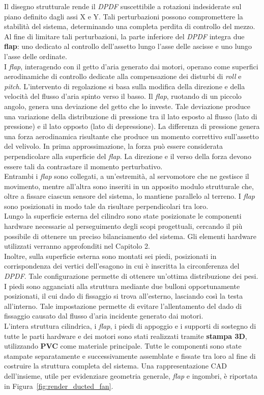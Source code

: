\documentclass[11pt]{report}
\begin{document}
	\newpage
	Il disegno strutturale rende il \textit{DPDF} suscettibile a rotazioni indesiderate sul piano definito dagli assi X e Y. Tali perturbazioni possono compromettere la stabilità del sistema, determinando una completa perdita di controllo del mezzo.\\
	Al fine di limitare tali perturbazioni, la parte inferiore del \textit{DPDF} integra due \textbf{flap}: uno dedicato al controllo dell'assetto lungo l'asse delle ascisse e uno lungo l'asse delle ordinate.\\
	I \textit{flap}, interagendo con il getto d'aria generato dai motori, operano come superfici aerodinamiche di controllo dedicate alla compensazione dei disturbi di \textit{roll} e \textit{pitch}. L'intervento di regolazione si basa sulla modifica della direzione e della velocità del flusso d'aria spinto verso il basso. Il \textit{flap}, ruotando di un piccolo angolo, genera una deviazione del getto che lo investe. Tale deviazione produce una variazione della distribuzione di pressione tra il lato esposto al flusso (lato di pressione) e il lato opposto (lato di depressione). La differenza di pressione genera una forza aerodinamica risultante che produce un momento correttivo sull'assetto del velivolo. In prima approssimazione, la forza può essere considerata perpendicolare alla superficie del \textit{flap}. La direzione e il verso della forza devono essere tali da contrastare il momento perturbativo.\\
	Entrambi i \textit{flap} sono collegati, a un'estremità, al servomotore che ne gestisce il movimento, mentre all'altra sono inseriti in un apposito modulo strutturale che, oltre a fissare ciascun sensore del sistema, lo mantiene parallelo al terreno. I \textit{flap} sono posizionati in modo tale da risultare perpendicolari tra loro.\\
	Lungo la superficie esterna del cilindro sono state posizionate le componenti hardware necessarie al perseguimento degli scopi progettuali, cercando il più possibile di ottenere un preciso bilanciamento del sistema. Gli elementi hardware utilizzati verranno approfonditi nel Capitolo 2.\\
	Inoltre, sulla superficie esterna sono montati sei piedi, posizionati in corrispondenza dei vertici dell'esagono in cui è inscritta la circonferenza del \textit{DPDF}. Tale configurazione permette di ottenere un'ottima distribuzione dei pesi. I piedi sono agganciati alla struttura mediante due bulloni opportunamente posizionati, il cui dado di fissaggio si trova all'esterno, lasciando così la testa all'interno. Tale impostazione permette di evitare l'allentamento del dado di fissaggio causato dal flusso d'aria incidente generato dai motori.\\
	L'intera struttura cilindrica, i \textit{flap}, i piedi di appoggio e i supporti di sostegno di tutte le parti hardware e dei motori sono stati realizzati tramite \textbf{stampa 3D}, utilizzando \textbf{PVC} come materiale principale. Tutte le componenti sono state stampate separatamente e successivamente assemblate e fissate tra loro al fine di costruire la struttura completa del sistema.
	Una rappresentazione CAD dell'insieme, utile per evidenziare geometria generale, \textit{flap} e ingombri, è riportata in Figura~\ref{fig:render_ducted_fan}.
\end{document}
